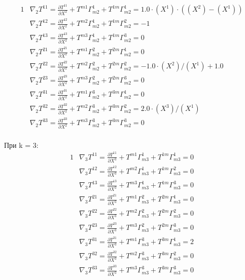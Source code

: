 \documentclass{article}
\begin{document}
\begin{alignat*}{1}
  & \nabla_2T^{11} = \frac{\partial T^{11}}{\partial X^2} + T^{m1}\Gamma^1_{m2} + T^{1m}\Gamma^1_{m2} = 1.0\cdot (X^1)\cdot ((X^2) - (X^1)) \\
  & \nabla_2T^{12} = \frac{\partial T^{12}}{\partial X^2} + T^{m2}\Gamma^1_{m2} + T^{1m}\Gamma^2_{m2} = -1 \\
  & \nabla_2T^{13} = \frac{\partial T^{13}}{\partial X^2} + T^{m3}\Gamma^1_{m2} + T^{1m}\Gamma^3_{m2} = 0 \\
  & \nabla_2T^{21} = \frac{\partial T^{21}}{\partial X^2} + T^{m1}\Gamma^2_{m2} + T^{2m}\Gamma^1_{m2} = 0 \\
  & \nabla_2T^{22} = \frac{\partial T^{22}}{\partial X^2} + T^{m2}\Gamma^2_{m2} + T^{2m}\Gamma^2_{m2} = -1.0\cdot (X^2)/(X^1) + 1.0 \\
  & \nabla_2T^{23} = \frac{\partial T^{23}}{\partial X^2} + T^{m3}\Gamma^2_{m2} + T^{2m}\Gamma^3_{m2} = 0 \\
  & \nabla_2T^{31} = \frac{\partial T^{31}}{\partial X^2} + T^{m1}\Gamma^3_{m2} + T^{3m}\Gamma^1_{m2} = 0 \\
  & \nabla_2T^{32} = \frac{\partial T^{32}}{\partial X^2} + T^{m2}\Gamma^3_{m2} + T^{3m}\Gamma^2_{m2} = 2.0\cdot (X^3)/(X^1) \\
  & \nabla_2T^{33} = \frac{\partial T^{33}}{\partial X^2} + T^{m3}\Gamma^3_{m2} + T^{3m}\Gamma^3_{m2} = 0 
\end{alignat*}\\
При k = 3:\\
\begin{alignat*}{1}
  & \nabla_3T^{11} = \frac{\partial T^{11}}{\partial X^3} + T^{m1}\Gamma^1_{m3} + T^{1m}\Gamma^1_{m3} = 0 \\
  & \nabla_3T^{12} = \frac{\partial T^{12}}{\partial X^3} + T^{m2}\Gamma^1_{m3} + T^{1m}\Gamma^2_{m3} = 0 \\
  & \nabla_3T^{13} = \frac{\partial T^{13}}{\partial X^3} + T^{m3}\Gamma^1_{m3} + T^{1m}\Gamma^3_{m3} = 0 \\
  & \nabla_3T^{21} = \frac{\partial T^{21}}{\partial X^3} + T^{m1}\Gamma^2_{m3} + T^{2m}\Gamma^1_{m3} = 0 \\
  & \nabla_3T^{22} = \frac{\partial T^{22}}{\partial X^3} + T^{m2}\Gamma^2_{m3} + T^{2m}\Gamma^2_{m3} = 0 \\
  & \nabla_3T^{23} = \frac{\partial T^{23}}{\partial X^3} + T^{m3}\Gamma^2_{m3} + T^{2m}\Gamma^3_{m3} = 0 \\
  & \nabla_3T^{31} = \frac{\partial T^{31}}{\partial X^3} + T^{m1}\Gamma^3_{m3} + T^{3m}\Gamma^1_{m3} = 2 \\
  & \nabla_3T^{32} = \frac{\partial T^{32}}{\partial X^3} + T^{m2}\Gamma^3_{m3} + T^{3m}\Gamma^2_{m3} = 0 \\
  & \nabla_3T^{33} = \frac{\partial T^{33}}{\partial X^3} + T^{m3}\Gamma^3_{m3} + T^{3m}\Gamma^3_{m3} = 0 
\end{alignat*}\\
\end{document}
